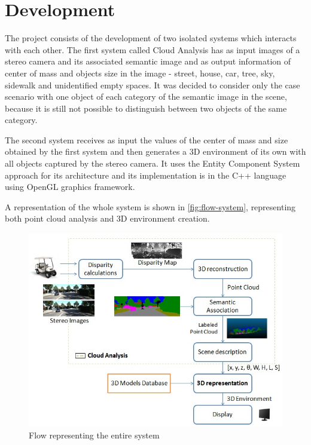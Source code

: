 
\chapter{Development}\label{development}

    The project consists of the development of two isolated systems which interacts with each other. The first system called Cloud Analysis has as input images of a stereo camera and its associated semantic image and as output information of center of mass and objects size in the image - street, house, car, tree, sky, sidewalk and unidentified empty spaces. It was decided to consider only the case scenario with one object of each category of the semantic image in the scene, because it is still not possible to distinguish between two objects of the same category. 

    The second system receives as input the values of the center of mass and size obtained by the first system and then generates a 3D environment of its own with all objects captured by the stereo camera. It uses the Entity Component System approach for its architecture and its implementation is in the C++ language using OpenGL graphics framework.
    
    A representation of the whole system is shown in \autoref{fig:flow-system}, representing both point cloud analysis and 3D environment creation.
    
    \begin{figure}[H]
        \caption{
        \label{fig:flow-system}
            Flow representing the entire system
        }
        \begin{center}
        \includegraphics[width=1\textwidth]{images/fluxo1.png}
        \end{center}
    \end{figure}    

